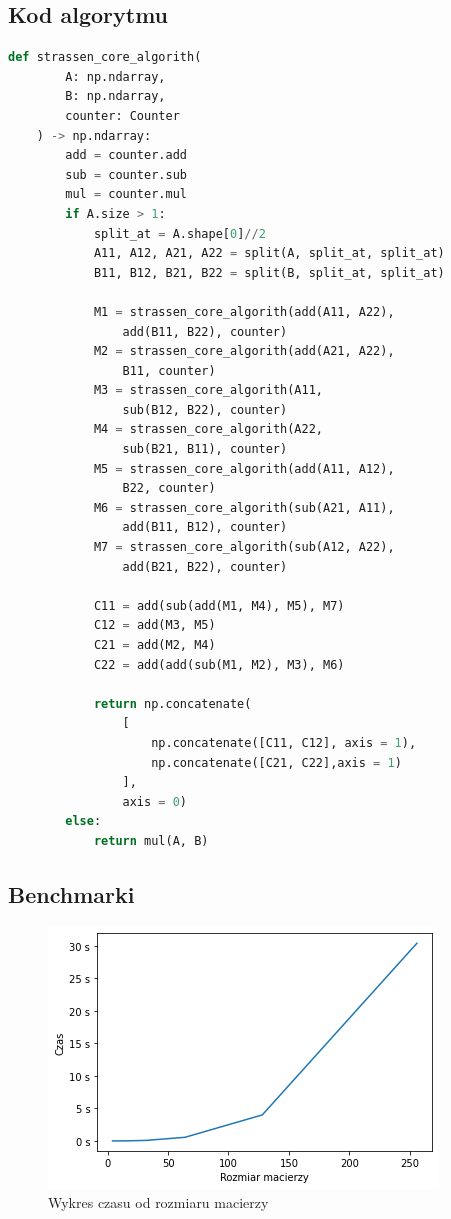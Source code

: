 \documentclass[12pt,a4paper,table]{article}
\begin{document}
    \subsection{Kod algorytmu}
    \begin{lstlisting}[language=Python]
    def strassen_core_algorith(
        A: np.ndarray, 
        B: np.ndarray, 
        counter: Counter
    ) -> np.ndarray:
        add = counter.add
        sub = counter.sub
        mul = counter.mul
        if A.size > 1:
            split_at = A.shape[0]//2
            A11, A12, A21, A22 = split(A, split_at, split_at)
            B11, B12, B21, B22 = split(B, split_at, split_at)
            
            M1 = strassen_core_algorith(add(A11, A22), 
                add(B11, B22), counter)
            M2 = strassen_core_algorith(add(A21, A22), 
                B11, counter)
            M3 = strassen_core_algorith(A11, 
                sub(B12, B22), counter)
            M4 = strassen_core_algorith(A22, 
                sub(B21, B11), counter)
            M5 = strassen_core_algorith(add(A11, A12), 
                B22, counter)
            M6 = strassen_core_algorith(sub(A21, A11), 
                add(B11, B12), counter)
            M7 = strassen_core_algorith(sub(A12, A22), 
                add(B21, B22), counter)    
    
            C11 = add(sub(add(M1, M4), M5), M7)
            C12 = add(M3, M5)
            C21 = add(M2, M4)
            C22 = add(add(sub(M1, M2), M3), M6)
    
            return np.concatenate(
                [
                    np.concatenate([C11, C12], axis = 1),
                    np.concatenate([C21, C22],axis = 1)
                ],
                axis = 0)
        else:
            return mul(A, B)
    \end{lstlisting}

    \subsection{Benchmarki}

    \begin{figure}[H]
        \centering
        \includegraphics[width=0.6\linewidth]{img/strassen_times.png}
        \caption{Wykres czasu od rozmiaru macierzy}
        \label{fig:strassen_times}
    \end{figure}
\end{document}
